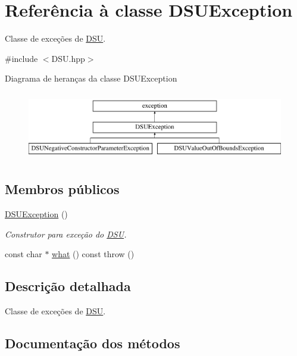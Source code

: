 \hypertarget{classDSUException}{}\section{Referência à classe D\+S\+U\+Exception}
\label{classDSUException}


Classe de exceções de \hyperlink{classDSU}{D\+SU}.  




{\ttfamily \#include $<$D\+S\+U.\+hpp$>$}

Diagrama de heranças da classe D\+S\+U\+Exception\begin{figure}[H]
\begin{center}
\leavevmode
\includegraphics[height=3.000000cm]{classDSUException}
\end{center}
\end{figure}
\subsection*{Membros públicos}
\begin{DoxyCompactItemize}
\item 
\mbox{\label{classDSUException_a7b5b0014b41c73335cdb76b5a48be47a}} 
\hyperlink{classDSUException_a7b5b0014b41c73335cdb76b5a48be47a}{D\+S\+U\+Exception} ()
\begin{DoxyCompactList}\small\item\em Construtor para exceção do \hyperlink{classDSU}{D\+SU}. \end{DoxyCompactList}\item 
const char $\ast$ \hyperlink{classDSUException_a997fa79b5a7cd55cc30792da2303ea3a}{what} () const  throw ()
\end{DoxyCompactItemize}


\subsection{Descrição detalhada}
Classe de exceções de \hyperlink{classDSU}{D\+SU}. 

\subsection{Documentação dos métodos}
\mbox{\label{classDSUException_a997fa79b5a7cd55cc30792da2303ea3a}} 
